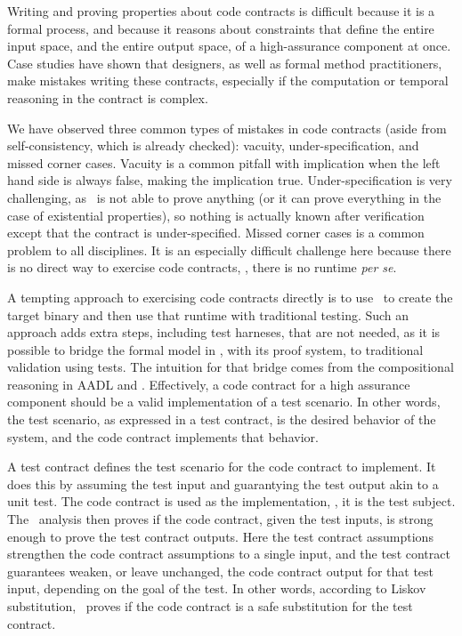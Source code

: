 Writing and proving properties about code contracts is difficult because it is a formal process, and because it reasons about constraints that define the entire input space, and the entire output space, of a high-assurance component at once.
Case studies have shown that designers, as well as formal method practitioners, make mistakes writing these contracts, especially if the computation or temporal reasoning in the contract is complex.

We have observed three common types of mistakes in code contracts (aside from self-consistency, which is
already checked): vacuity, under-specification, and missed corner cases.
Vacuity is a common pitfall with implication when the left hand side is always false, making the implication true. 
Under-specification is very challenging, as \agr\ is not able to prove anything (or it can prove everything in the case of existential properties), so nothing is actually known after verification except that the contract is under-specified. 
Missed corner cases is a common problem to all disciplines.
It is an especially difficult challenge here because there is no direct way to exercise code contracts, \eg, there is no runtime \emph{per se}.

A tempting approach to exercising code contracts directly is to use \splt\ to create the target binary and then use that runtime with traditional testing.
Such an approach adds extra steps, including test harneses, that are not needed, as it is
possible to bridge the formal model in \agr, with its proof system, to
traditional validation using tests.
The intuition for that bridge comes from the compositional reasoning in AADL and \agr. 
Effectively, a code contract for a high assurance component should be a valid implementation of a test scenario.
In other words, the test scenario, as expressed in a test contract, is the desired behavior of the system, and the code contract implements that behavior.

A test contract defines the test scenario for the code contract to implement.
It does this by assuming the test input and guarantying the test output akin to a unit test. 
The code contract is used as the implementation, \eg, it is the test subject.
The \agr\ analysis then proves if the code contract, given the test inputs, is strong enough to prove the test contract outputs.
Here the test contract assumptions strengthen the code contract assumptions to a single input, and the test contract guarantees weaken, or leave unchanged, the code contract output for that test input, depending on the goal of the test.
In other words, according to Liskov substitution, \agr\ proves if the code contract is a safe substitution for the test contract.

